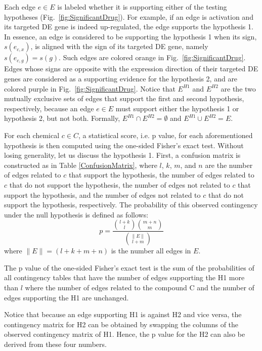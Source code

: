 Each edge $e \in E$ is labeled whether it is supporting either of the testing hypotheses (Fig.~\ref{fig:SignificantDrug}). 
For example, if an edge is activation and its targeted DE gene is indeed up-regulated, the edge supports the hypothesis 1. 
In essence, an edge is considered to be supporting the hypothesis 1 when its sign, $s(e_{c,x})$, is aligned with the sign of its targeted DE gene, namely $s(e_{c,g}) = s(g)$. 
Such edges are colored orange in Fig.~\ref{fig:SignificantDrug}. 
Edges whose signs are opposite with the expression direction of their targeted DE genes are considered as a supporting evidence for the hypothesis 2, and are colored purple in  Fig.~\ref{fig:SignificantDrug}. 
Notice that $E^{H1}$ and $E^{H2}$ are the two mutually exclusive sets of edges that support the first and second hypothesis, respectively, because an edge $e \in E$ must support either the hypothesis 1 or hypothesis 2, but not both. Formally, $E^{H1} \cap E^{H2} = \emptyset$ and  $E^{H1} \cup E^{H2} = E$. 

For each chemical $c \in C$, a statistical score, i.e. p value, for each aforementioned hypothesis is then computed using the one-sided Fisher's exact test. Without losing generality, let us discuss the hypothesis 1. First, a confusion matrix is constructed as in Table \ref{ConfusionMatrix}, where $l$, $k$, $m$, and $n$ are the number of edges related to $c$ that support the hypothesis, the number of edges related to $c$ that do not support the hypothesis, the number of edges not related to $c$ that support the hypothesis, and the number of edges not related to $c$ that do not support the hypothesis, respectively. 
The probability of this observed contingency under the null hypothesis is defined as follows:
\begin{equation}
p = \frac{ {l+k \choose l}{m+n \choose m}}{{\|E\| \choose l + m}}
\end{equation}
where $\|E\| = (l+k+m+n)$ is the number all edges in $E$. 

The p value of the one-sided Fisher's exact test is the sum of the probabilities of all contingency tables that have the number of edges supporting the H1 more than $l$ where the number of edges related to the compound C and the number of edges supporting the H1 are unchanged.

Notice that because an edge supporting H1 is against H2 and vice versa, the contingency matrix for H2 can be obtained by swapping the columns of the observed contingency matrix of H1. Hence, the p value for the H2 can also be derived from these four numbers.



